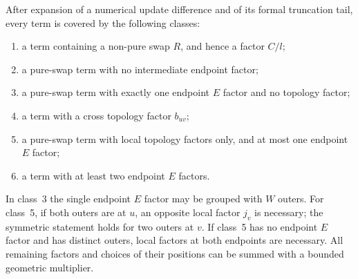 \begin{lemma}
\label{lem:cleanup-words}
After expansion of a numerical update difference and of its formal
truncation tail, every term is covered by the following classes:
\begin{enumerate}
\item a term containing a non-pure swap $R$, and hence a factor $C/l$;
\item a pure-swap term with no intermediate endpoint factor;
\item a pure-swap term with exactly one endpoint $E$ factor and no
topology factor;
\item a term with a cross topology factor $b_{uv}$;
\item a pure-swap term with local topology factors only, and at
most one endpoint $E$ factor;
\item a term with at least two endpoint $E$ factors.
\end{enumerate}
In class~3 the single endpoint $E$ factor may be grouped with
$W$ outers.  For class~5, if both outers are at $u$, an opposite
local factor $j_v$ is necessary; the symmetric statement holds
for two outers at $v$.  If class~5 has no endpoint $E$ factor and
has distinct outers, local factors at both endpoints are necessary.
All remaining factors and choices of their positions can be summed
with a bounded geometric multiplier.
\end{lemma}

